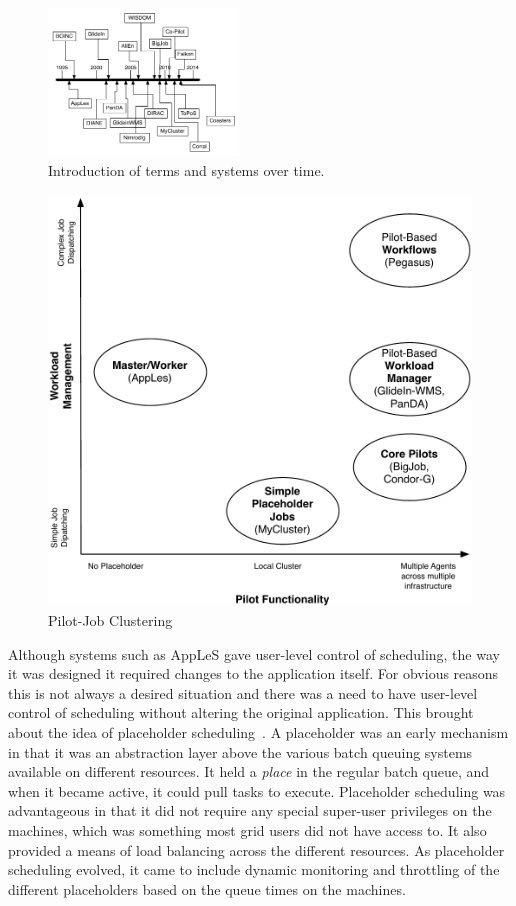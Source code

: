 \documentclass{sig-alternate}
\begin{document}
%
%
\begin{figure}[t]
  \centering
    \includegraphics[width=0.45\textwidth]{figures/timeline}
    \caption{Introduction of terms and systems over time.}
    \label{fig:timeline}
\end{figure}

\begin{figure}[t]
	\centering
		\includegraphics[width=.45\textwidth]{figures/pilotjob-clustering.pdf}
	\caption{Pilot-Job Clustering}
	\label{fig:pilotjob_clustering}
\end{figure}


Although systems such as AppLeS gave user-level control of scheduling, the way
it was designed it required changes to the application itself.
For obvious reasons this is not always a desired situation and there was a need
to have user-level control of scheduling without altering the original
application.
This brought about the idea of placeholder
scheduling~\cite{Pinchak02practicalheterogeneous}.
A placeholder was an early \pilot mechanism in that it was an abstraction layer
above the various batch queuing systems available on different resources.
It held a \textit{place} in the regular batch queue, and when it
became active, it could pull tasks to execute.  Placeholder scheduling
was advantageous in that it did not require any special super-user
privileges on the machines, which was something most grid users did
not have access to.  It also provided a means of load balancing across
the different resources.  As placeholder scheduling evolved, it came
to include dynamic monitoring and throttling of the different
placeholders based on the queue times on the machines.
\end{document}
